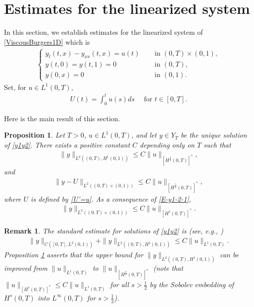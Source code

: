 \documentclass[11pt, reqno]{amsart}
\theoremstyle{plain}
\newtheorem{proposition}[thm]{Proposition}
\newtheorem{remark}{Remark}
\numberwithin{equation}{section}
\begin{document}
\section{Estimates for the linearized system}	\label{subsec-2ineq}
In this section, we establish estimates for the linearized system of \eqref{ViscousBurgers1D} which is 
\begin{align}
	\label{y1y2}
            \begin{cases}
                y_{t}(t, x) - y_{xx} (t, x) = u(t) \quad &\text{ in } (0, T) \times (0, 1), \\[6pt]
                y(t, 0) = y(t, 1) = 0 &\text{ in } (0, T), \\[6pt]
                y(0, x) = 0 &\text{ in } (0, 1).
            \end{cases}
\end{align}
Set, for $ u \in L^1(0, T)$, 
\begin{align} \label{U'=u}
	U(t) = \int_0^t u(s) ds \quad \text{ for } t \in [0, T].
\end{align}

Here is the main result of this section. 

\begin{proposition}	\label{pro-y1} Let $T > 0$, $u \in L^1(0, T)$, and let $y \in Y_T$ be the unique solution of \eqref{y1y2}. There exists a positive constant $C$ depending only on $T$ such that
\begin{align}	\label{E-1-y1-1}
	\|y \|_{L^2((0, T), H^1(0, 1))} \leq C \|u\|_{[H^{\frac{3}{4}}(0, T)]^*}, 
\end{align}
and
\begin{align}
           \|y - U\|_{L^2((0, T) \times (0, 1))} \leq C \|u\|_{[H^{\frac{5}{4}}(0, T)]^*},  \label{E-y1-2-1}  
\end{align}
where $U$ is defined by \eqref{U'=u}. As a consequence of \eqref{E-y1-2-1},
\begin{align}
	\|y\|_{L^2((0, T) \times (0, 1))} \leq C \|u\|_{[H^1(0, T)]^*}.
\end{align}
\end{proposition}

\begin{remark} \rm \label{rem-y1} 
The standard estimate for solutions of \eqref{y1y2} is (see, e.g., )
\begin{align}
	\|y\|_{C([0, T], L^2(0, 1))} + \|y\|_{L^2((0, T), H^1(0, 1))} \leq C \|u\|_{L^1(0, T)}.
\end{align}
Proposition \ref{pro-y1} asserts that  the upper bound for $\|y \|_{L^2((0, T), H^1(0, 1))}$ can be improved from $\|u\|_{L^1(0, T)}$ to $\|u\|_{[H^{\frac{3}{4}}(0, T)]^*}$ (note that $\|u\|_{[H^s(0, T)]^*} \leq C \|u\|_{L^1(0, T)}$ for all $s > \frac{1}{2}$ by the Sobolev embedding of $H^s(0, T)$ into $L^\infty(0, T)$ for $s > \frac{1}{2}$). 

\end{remark}
\end{document}
